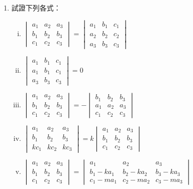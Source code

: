 \begin{enumerate}[1.]
  \item 試證下列各式：
  \begin{enumerate}[(i)]
    \item $\begin{vmatrix} a_1 & a_2 & a_3 \\ b_1 & b_2 & b_3 \\ c_1 & c_2 & c_3 \end{vmatrix} = \begin{vmatrix} a_1 & b_1 & c_1 \\ a_2 & b_2 & c_2 \\ a_3 & b_3 & c_3 \end{vmatrix}$
    \item $\begin{vmatrix} a_1 & b_1 & c_1 \\ a_1 & b_1 & c_1 \\ a_3 & b_3 & c_3 \end{vmatrix} = 0$
    \item $\begin{vmatrix} a_1 & a_2 & a_3 \\ b_1 & b_2 & b_3 \\ c_1 & c_2 & c_3 \end{vmatrix} = - \begin{vmatrix} b_1 & b_2 & b_3 \\ a_1 & a_2 & a_3 \\ c_1 & c_2 & c_3 \end{vmatrix}$
    \item $\begin{vmatrix} a_1 & a_2 & a_3 \\ b_1 & b_2 & b_3 \\ kc_1 & kc_2 & kc_3 \end{vmatrix} = k \begin{vmatrix} a_1 & a_2 & a_3 \\ b_1 & b_2 & b_3 \\ c_1 & c_2 & c_3 \end{vmatrix}$
    \item $\begin{vmatrix} a_1 & a_2 & a_3 \\ b_1 & b_2 & b_3 \\ c_1 & c_2 & c_3 \end{vmatrix} = \begin{vmatrix} a_1 & a_2 & a_3 \\ b_1-ka_1 & b_2-ka_2 & b_3-ka_3 \\ c_1-ma_1 & c_2-ma_2 & c_3-ma_3 \end{vmatrix}$
  \end{enumerate}


\end{enumerate}

